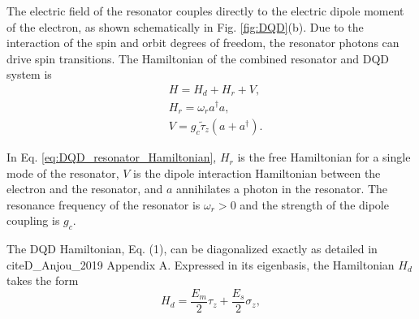 \documentclass[12pt]{report}
\begin{document}
The electric field of the resonator couples directly to the electric dipole moment of the electron, as shown schematically in Fig. \ref{fig:DQD}(b). 
Due to the interaction of the spin and orbit degrees of freedom, the resonator photons can drive spin transitions. 
The Hamiltonian of the combined resonator and DQD system is
\begin{equation}\label{eq:DQD_resonator_Hamiltonian}
    \begin{aligned} 
        & H=H_d+H_r+V, \\
        & H_r=\omega_r a^{\dagger} a, \\    
    & V=g_c \tilde{\tau}_z\left(a+a^{\dagger}\right) .
    \end{aligned}
\end{equation}

In Eq. \ref{eq:DQD_resonator_Hamiltonian}, $H_r$ is the free Hamiltonian for a single mode of the resonator, $V$ is the dipole interaction Hamiltonian between the electron and the resonator, and $a$ annihilates a photon in the resonator. 
The resonance frequency of the resonator is $\omega_r>0$ and the strength of the dipole coupling is $g_c$.

The DQD Hamiltonian, Eq. (1), can be diagonalized exactly as detailed in cite{D_Anjou_2019} Appendix A. Expressed in its eigenbasis, the Hamiltonian $H_d$ takes the form
\begin{equation}\label{eq:DQD_Hamiltonian_in_eigenbasis}
    H_d=\frac{E_m}{2} \tau_z+\frac{E_s}{2} \sigma_z,    
\end{equation}
\end{document}
